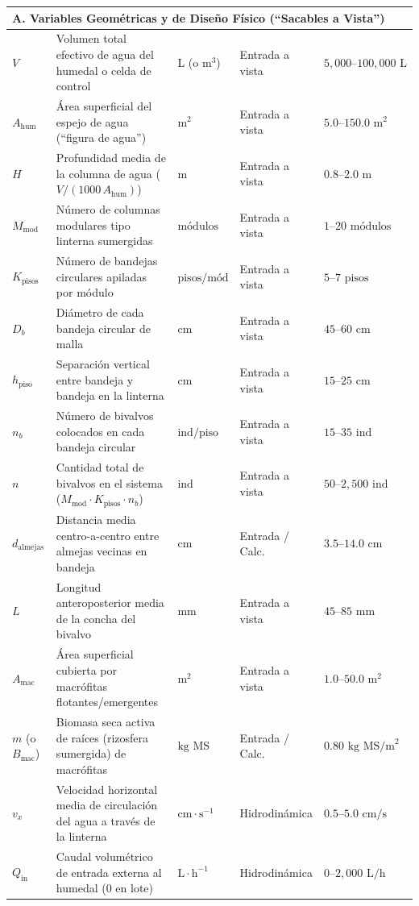 \documentclass[11pt,letterpaper]{article}
\begin{document}
{\begin{longtable}{p{1.85cm} p{5.95cm} p{2.15cm} p{2.15cm} p{2.55cm}}
\multicolumn{5}{l}{\textbf{A. Variables Geométricas y de Diseño Físico (``Sacables a Vista'')}} \\
\hline
$V$ & Volumen total efectivo de agua del humedal o celda de control & $\text{L}$ (o $\text{m}^3$) & Entrada a vista & $5,000\text{--}100,000\text{ L}$ \\
$A_{\text{hum}}$ & Área superficial del espejo de agua (``figura de agua'') & $\text{m}^2$ & Entrada a vista & $5.0\text{--}150.0\text{ m}^2$ \\
$H$ & Profundidad media de la columna de agua ($V / (1000\,A_{\text{hum}})$) & $\text{m}$ & Entrada a vista & $0.8\text{--}2.0\text{ m}$ \\
$M_{\text{mod}}$ & Número de columnas modulares tipo linterna sumergidas & $\text{módulos}$ & Entrada a vista & $1\text{--}20\text{ módulos}$ \\
$K_{\text{pisos}}$ & Número de bandejas circulares apiladas por módulo & $\text{pisos/mód}$ & Entrada a vista & $5\text{--}7\text{ pisos}$ \\
$D_b$ & Diámetro de cada bandeja circular de malla & $\text{cm}$ & Entrada a vista & $45\text{--}60\text{ cm}$ \\
$h_{\text{piso}}$ & Separación vertical entre bandeja y bandeja en la linterna & $\text{cm}$ & Entrada a vista & $15\text{--}25\text{ cm}$ \\
$n_b$ & Número de bivalvos colocados en cada bandeja circular & $\text{ind/piso}$ & Entrada a vista & $15\text{--}35\text{ ind}$ \\
$n$ & Cantidad total de bivalvos en el sistema ($M_{\text{mod}}\cdot K_{\text{pisos}}\cdot n_b$) & $\text{ind}$ & Entrada a vista & $50\text{--}2,500\text{ ind}$ \\
$d_{\text{almejas}}$ & Distancia media centro-a-centro entre almejas vecinas en bandeja & $\text{cm}$ & Entrada / Calc. & $3.5\text{--}14.0\text{ cm}$ \\
$L$ & Longitud anteroposterior media de la concha del bivalvo & $\text{mm}$ & Entrada a vista & $45\text{--}85\text{ mm}$ \\
$A_{\text{mac}}$ & Área superficial cubierta por macrófitas flotantes/emergentes & $\text{m}^2$ & Entrada a vista & $1.0\text{--}50.0\text{ m}^2$ \\
$m$ (o $B_{\text{mac}}$) & Biomasa seca activa de raíces (rizosfera sumergida) de macrófitas & $\text{kg MS}$ & Entrada / Calc. & $0.80\text{ kg MS/m}^2$ \\
$v_x$ & Velocidad horizontal media de circulación del agua a través de la linterna & $\text{cm}\cdot\text{s}^{-1}$ & Hidrodinámica & $0.5\text{--}5.0\text{ cm/s}$ \\
$Q_{\text{in}}$ & Caudal volumétrico de entrada externa al humedal ($0$ en lote) & $\text{L}\cdot\text{h}^{-1}$ & Hidrodinámica & $0\text{--}2,000\text{ L/h}$ \\
\hline


\end{longtable}}
\end{document}
